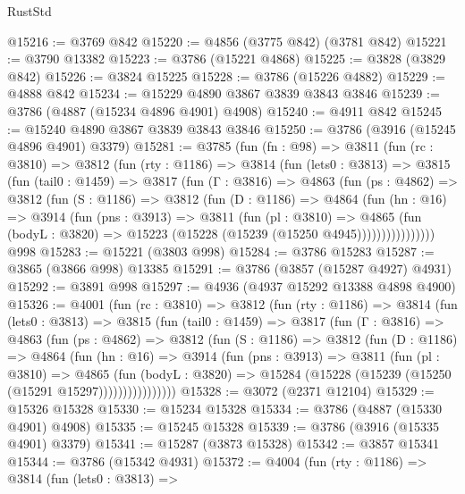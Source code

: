 \begin{lexlean}{RustStd}
\begin{coremodule}
@15216 := @3769 @842
@15220 := @4856 (@3775 @842) (@3781 @842)
@15221 := @3790 @13382
@15223 := @3786 (@15221 @4868)
@15225 := @3828 (@3829 @842)
@15226 := @3824 @15225
@15228 := @3786 (@15226 @4882)
@15229 := @4888 @842
@15234 := @15229 @4890 @3867 @3839 @3843 @3846
@15239 := @3786 (@4887 (@15234 @4896 @4901) @4908)
@15240 := @4911 @842
@15245 := @15240 @4890 @3867 @3839 @3843 @3846
@15250 := @3786 (@3916 (@15245 @4896 @4901) @3379)
@15281 := @3785
    (fun (fn : @98) =>
    @3811
      (fun (rc : @3810) =>
      @3812
        (fun (rty : @1186) =>
        @3814
          (fun (lets0 : @3813) =>
          @3815
            (fun (tail0 : @1459) =>
            @3817
              (fun (Γ : @3816) =>
              @4863
                (fun (ps : @4862) =>
                @3812
                  (fun (S : @1186) =>
                  @3812
                    (fun (D : @1186) =>
                    @4864
                      (fun (hn : @16) =>
                      @3914
                        (fun (pns : @3913) =>
                        @3811
                          (fun (pl : @3810) =>
                          @4865
                            (fun (bodyL : @3820) =>
                            @15223 (@15228 (@15239 (@15250 @4945))))))))))))))))
    @998
@15283 := @15221 (@3803 @998)
@15284 := @3786 @15283
@15287 := @3865 (@3866 @998) @13385
@15291 := @3786 (@3857 (@15287 @4927) @4931)
@15292 := @3891 @998
@15297 := @4936 (@4937 @15292 @13388 @4898 @4900)
@15326 := @4001
    (fun (rc : @3810) =>
    @3812
      (fun (rty : @1186) =>
      @3814
        (fun (lets0 : @3813) =>
        @3815
          (fun (tail0 : @1459) =>
          @3817
            (fun (Γ : @3816) =>
            @4863
              (fun (ps : @4862) =>
              @3812
                (fun (S : @1186) =>
                @3812
                  (fun (D : @1186) =>
                  @4864
                    (fun (hn : @16) =>
                    @3914
                      (fun (pns : @3913) =>
                      @3811
                        (fun (pl : @3810) =>
                        @4865
                          (fun (bodyL : @3820) =>
                          @15284 (@15228 (@15239 (@15250 (@15291 @15297))))))))))))))))
@15328 := @3072 (@2371 @12104)
@15329 := @15326 @15328
@15330 := @15234 @15328
@15334 := @3786 (@4887 (@15330 @4901) @4908)
@15335 := @15245 @15328
@15339 := @3786 (@3916 (@15335 @4901) @3379)
@15341 := @15287 (@3873 @15328)
@15342 := @3857 @15341
@15344 := @3786 (@15342 @4931)
@15372 := @4004
    (fun (rty : @1186) =>
    @3814
      (fun (lets0 : @3813) =>

\end{coremodule}
\end{lexlean}
